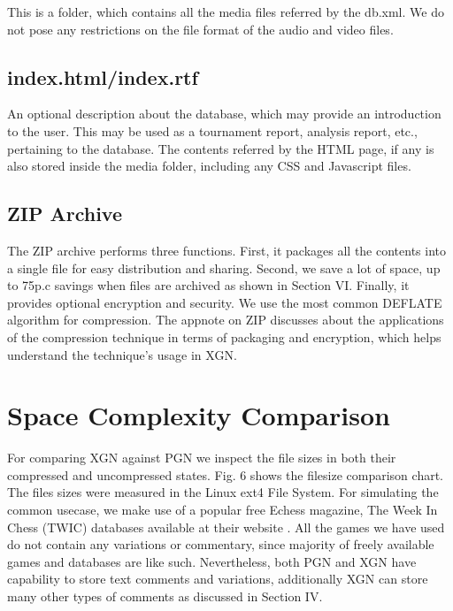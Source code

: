 \documentclass[conference]{IEEEtran}
\begin{document}
This is a folder, which contains all the media files referred by the db.xml. We do not pose any restrictions on the file format of the audio and video files.




\subsection{index.html/index.rtf}

An optional description about the database, which may provide an introduction to the user. This may be used as a tournament report, analysis report, etc., pertaining to the database. The contents referred by the HTML page, if any is also stored inside the media folder, including any CSS and Javascript files.




\subsection{ZIP Archive}

The ZIP archive performs three functions. First, it packages all the contents into a single file for easy distribution and sharing. Second, we save a lot of space, up to 75p.c savings when files are archived as shown in Section VI. Finally, it provides optional encryption and security. We use the most common DEFLATE algorithm \cite{ab08}
 for compression. The appnote on ZIP \cite{ab09}
 discusses about the applications of the compression technique in terms of packaging and encryption, which helps understand the technique's usage in XGN.




\section{Space Complexity Comparison}

For comparing XGN against PGN we inspect the file sizes in both their compressed and uncompressed states. Fig. 6 shows the file\textendash size comparison chart. The files sizes were measured in the Linux ext4 File System. For simulating the common use\textendash case, we make use of a popular free E\textendash chess magazine, The Week In Chess (TWIC) databases available at their website \cite{ab10}
. All the games we have used do not contain any variations or commentary, since majority of freely available games and databases are like such. Nevertheless, both PGN and XGN have capability to store text comments and variations, additionally XGN can store many other types of comments as discussed in Section IV.
\end{document}
